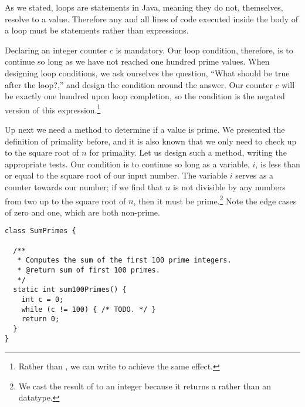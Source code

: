 As we stated, loops are statements in Java, meaning they do not, themselves, resolve to a value. Therefore any and all lines of code executed inside the body of a loop must be statements rather than expressions.


Declaring an integer counter $c$ is mandatory. Our loop condition, therefore, is to continue so long as we have not reached one hundred prime values. When designing loop conditions, we ask ourselves the question, ``What should be true after the loop?,'' and design the condition around the answer. Our counter $c$ will be exactly one hundred upon loop completion, so the condition is the negated version of this expression.\footnote{Rather than , we can write  to achieve the same effect.}

Up next we need a method to determine if a value is prime. We presented the definition of primality before, and it is also known that we only need to check up to the square root of $n$ for primality. Let us design such a method, writing the appropriate tests. Our condition is to continue so long as a variable, $i$, is less than or equal to the square root of our input number. The variable $i$ serves as a counter towards our number; if we find that $n$ is not divisible by any numbers from two up to the square root of $n$, then it must be prime.\footnote{We cast the result of  to an integer because it returns a  rather than an  datatype.} Note the edge cases of zero and one, which are both non-prime.

\begin{lstlisting}[language=MyJava]
class SumPrimes {

  /**
   * Computes the sum of the first 100 prime integers.
   * @return sum of first 100 primes.
   */
  static int sum100Primes() {
    int c = 0;
    while (c != 100) { /* TODO. */ }
    return 0;
  }
}
\end{lstlisting}

